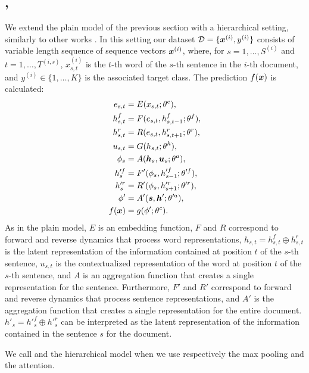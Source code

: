 \subsection{\maxh, \softmaxh}
\label{sec:modelh}
We extend the plain model of the previous section with a hierarchical setting,
similarly to other works \cite{yang_hierarchical_2016}. In this
setting our dataset $\mathcal{D}=\{\bm{x}^{(i)},y^{(i)}\}$
consists of variable length sequence of sequence vectors
$\bm{x}^{(i)}$, where, for $s=1,\dots,S^{(i)}$ and
$t=1,\dots,T^{(i,s)}$, $x_{s,t}^{(i)}$ is the $t$-th word of the $s$-th sentence in the
$i$-th document, and $y^{(i)}\in\{1,\dots,K\}$ is the associated
target class. The prediction $f(\bm{x})$ is calculated: 
\begin{align}
  e_{s,t} &= E(x_{s,t};\theta^e),\label{eq:embedH}\\
  h^f_{s,t} &= F(e_{s,t},h^f_{s,t-1};\theta^{f}),\label{eq:maxModelRLH}\\  
  h^r_{s,t} &= R(e_{s,t},h^r_{s,t+1};\theta^{r}),\label{eq:maxModelRRH}\\
  u_{s,t} &= G(h_{s,t};\theta^{h}),\label{eq:maxModelFH}\\
  \phi_s &= A(\bm{h}_s,\bm{u}_s;\theta^{a}),\label{eq:aggregationH}\\
  h'^{f}_{s} &= F'(\phi_{s},h'^{f}_{s-1};\theta'^{f}),\label{eq:maxModelRLHS}\\  
  h'^{r}_{s} &= R'(\phi_{s},h'^{r}_{s+1};\theta'^{r}),\label{eq:maxModelRRHS}\\
  \phi' &= A'(\bm{s},\bm{h}';\theta'^{a}),\label{eq:aggregationHS}\\
  f(\bm{x}) &= g(\phi';\theta^c).\label{eq:maxModelCH}
\end{align}
As in the plain model, $E$ is an embedding function, $F$ and $R$
correspond to forward and reverse dynamics that process word
representations,
$h_{s,t}=h_{s,t}^f\oplus h_{s,t}^r$ is the latent representation of
the information contained at position $t$ of the $s$-th sentence,
$u_{s,t}$ is the contextualized representation of the word at position
$t$ of the $s$-th sentence, and $A$ is an aggregation function that
creates a single representation for the sentence. Furthermore, $F'$ and
$R'$ correspond to 
forward and reverse dynamics that process sentence representations,
and $A'$ is the aggregation function that creates a single
representation for the entire document. $h'_s=h'^f_s\oplus h'^r_s$
can be interpreted as the
latent representation of the information contained in the sentence $s$
for the document.

We call \maxh{} and \softmaxh{} the hierarchical model when we use
respectively the max pooling and the attention.


